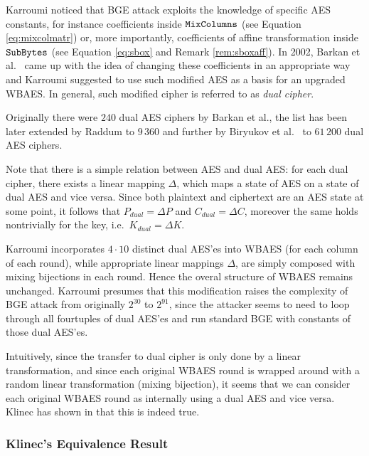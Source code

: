 	Karroumi noticed that BGE attack exploits the knowledge of specific AES constants, for instance coefficients inside $\texttt{MixColumns}$ (see Equation \ref{eq:mixcolmatr}) or, more importantly, coefficients of affine transformation inside $\texttt{SubBytes}$ (see Equation \ref{eq:sbox} and Remark \ref{rem:sboxaff}). In 2002, Barkan et al.\ \cite{barkan2002many} came up with the idea of changing these coefficients in an appropriate way and Karroumi suggested to use such modified AES as a basis for an upgraded WBAES. In general, such modified cipher is referred to as {\em dual cipher}.
	
	Originally there were $240$ dual AES ciphers by Barkan et al., the list has been later extended by Raddum \cite{raddum2004more} to $9\,360$ and further by Biryukov et al.\ \cite{biryukov2003toolbox} to $61\,200$ dual AES ciphers.
	
	Note that there is a simple relation between AES and dual AES: for each dual cipher, there exists a linear mapping $\Delta$, which maps a state of AES on a state of dual AES and vice versa. Since both plaintext and ciphertext are an AES state at some point, it follows that $P_{dual} = \Delta P$ and $C_{dual} = \Delta C$, moreover the same holds nontrivially for the key, i.e.\ $K_{dual} = \Delta K$.
	
	Karroumi incorporates $4\cdot 10$ distinct dual AES'es into WBAES (for each column of each round), while appropriate linear mappings $\Delta$, are simply composed with mixing bijections in each round. Hence the overal structure of WBAES remains unchanged. Karroumi presumes that this modification raises the complexity of BGE attack from originally $2^{30}$ to $2^{91}$, since the attacker seems to need to loop through all fourtuples of dual AES'es and run standard BGE with constants of those dual AES'es.
	
	Intuitively, since the transfer to dual cipher is only done by a linear transformation, and since each original WBAES round is wrapped around with a random linear transformation (mixing bijection), it seems that we can consider each original WBAES round as internally using a dual AES and vice versa. Klinec has shown in \cite[Proposition~2]{klinec2013white} that this is indeed true.

\subsubsection{Klinec's Equivalence Result}
	
